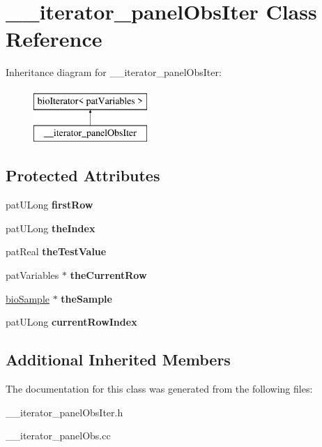 \hypertarget{class____iterator__panel_obs_iter}{}\section{\+\_\+\+\_\+iterator\+\_\+panel\+Obs\+Iter Class Reference}
\label{class____iterator__panel_obs_iter}
Inheritance diagram for \+\_\+\+\_\+iterator\+\_\+panel\+Obs\+Iter\+:\begin{figure}[H]
\begin{center}
\leavevmode
\includegraphics[height=2.000000cm]{class____iterator__panel_obs_iter}
\end{center}
\end{figure}
\subsection*{Protected Attributes}
\begin{DoxyCompactItemize}
\item 
\mbox{\label{class____iterator__panel_obs_iter_abb71e1ec5783f7fecc015a66c02b162a}} 
pat\+U\+Long {\bfseries first\+Row}
\item 
\mbox{\label{class____iterator__panel_obs_iter_a77c38ce5aeaf88a848b93b9770458b41}} 
pat\+U\+Long {\bfseries the\+Index}
\item 
\mbox{\label{class____iterator__panel_obs_iter_a49b4455cdd4b026545a8e6995a9443e5}} 
pat\+Real {\bfseries the\+Test\+Value}
\item 
\mbox{\label{class____iterator__panel_obs_iter_ad0e6ecb8c804b9d7334be78a1f6ff29e}} 
pat\+Variables $\ast$ {\bfseries the\+Current\+Row}
\item 
\mbox{\label{class____iterator__panel_obs_iter_a1da7a17cc69e689b94c44668c158276c}} 
\hyperlink{classbio_sample}{bio\+Sample} $\ast$ {\bfseries the\+Sample}
\item 
\mbox{\label{class____iterator__panel_obs_iter_a55c10be3d713f12284fdcd7a524b48f3}} 
pat\+U\+Long {\bfseries current\+Row\+Index}
\end{DoxyCompactItemize}
\subsection*{Additional Inherited Members}


The documentation for this class was generated from the following files\+:\begin{DoxyCompactItemize}
\item 
\+\_\+\+\_\+iterator\+\_\+panel\+Obs\+Iter.\+h\item 
\+\_\+\+\_\+iterator\+\_\+panel\+Obs.\+cc\end{DoxyCompactItemize}
